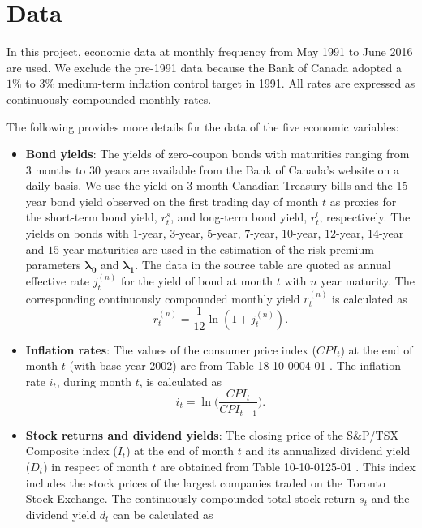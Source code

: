 \documentclass{sfuthesis}
\numberwithin{equation}{chapter}
\begin{document}
	
	\section{Data}
	\label{Data}

		\justify
		In this project, economic data at monthly frequency from May 1991 to June 2016 are used. We exclude the pre-1991 data because the Bank of Canada adopted a $1\%$ to $3\%$ medium-term inflation control target in 1991. All rates are expressed as continuously compounded monthly rates.
	
	
		\justify
		The following provides more details for the data of the five economic variables:
		\begin{itemize}
			\item \textbf{Bond yields}: The yields of zero-coupon bonds with maturities ranging from 3 months to 30 years are available from the Bank of Canada's website on a daily basis. We use the yield on 3-month Canadian Treasury bills and the 15-year bond yield observed on the first trading day of month $t$ as proxies for the short-term bond yield, $r_t^s$, and long-term bond yield, $r_t^l$, respectively. The yields on bonds with $1$-year, $3$-year, $5$-year, $7$-year, $10$-year, $12$-year, $14$-year and $15$-year maturities are used in the estimation of the risk premium parameters $\boldsymbol{\lambda_0}$ and $\boldsymbol{\lambda_1}$. The data in the source table are quoted as annual effective rate $j_t^{(n)}$ for the yield of bond at month $t$ with $n$ year maturity. The corresponding continuously compounded monthly yield $r_t^{(n)}$ is calculated as
			\begin{equation}
			\label{eq:EMR_13}
			r_t^{(n)} = \frac{1}{12}\ln(1+j_t^{(n)}).
			\end{equation}
			\item \textbf{Inflation rates}: The values of the consumer price index ($CPI_t$) at the end of month $t$ (with base year 2002) are from Table 18-10-0004-01 \citep{StatCAb}. The inflation rate $i_t$, during month $t$, is calculated as
			\begin{equation}
			\label{eq:EMR_14}
			i_{t} = \ln\bigg(\frac{CPI_t}{CPI_{t-1}}\bigg).
			\end{equation}
			\item \textbf{Stock returns and dividend yields}: The closing price of the  S\&P/TSX Composite index ($I_t$) at the end of month $t$ and its annualized dividend yield ($D_t$) in respect of month $t$ are obtained from Table 10-10-0125-01 \citep{StatCAa}. This index includes the stock prices of the largest companies traded on the Toronto Stock Exchange. The continuously compounded total stock return $s_t$ and the dividend yield $d_t$ can be calculated as

\end{itemize}
\end{document}
